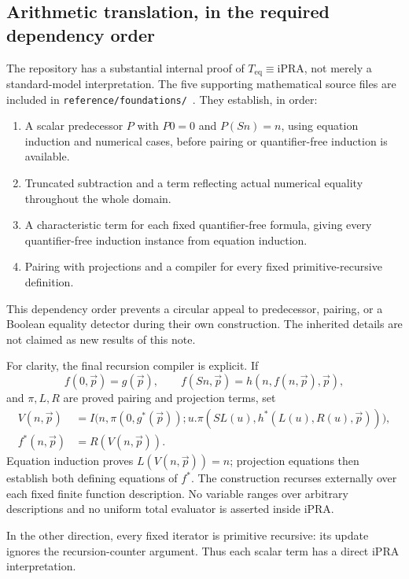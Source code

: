 \documentclass[11pt]{article}
\theoremstyle{definition}\newtheorem{definition}[theorem]{Definition}
\newcommand{\ipra}{\mathrm{iPRA}}
\newcommand{\Teq}{T_{\mathrm{eq}}}
\begin{document}
\subsection{Arithmetic translation, in the required dependency order}

The repository has a substantial internal proof of
$\Teq\equiv\ipra$, not merely a standard-model interpretation.
The five supporting mathematical source files are included in
\texttt{reference/foundations/}~\cite{bridge}. They establish, in order:
\begin{enumerate}
 \item A scalar predecessor $P$ with $P0=0$ and $P(Sn)=n$,
       using equation induction and numerical cases, before pairing
       or quantifier-free induction is available.
 \item Truncated subtraction and a term reflecting actual numerical
       equality throughout the whole domain.
 \item A characteristic term for each fixed quantifier-free formula,
       giving every quantifier-free induction instance from equation
       induction.
 \item Pairing with projections and a compiler for every fixed
       primitive-recursive definition.
\end{enumerate}
This dependency order prevents a circular appeal to predecessor,
pairing, or a Boolean equality detector during their own construction.
The inherited details are not claimed as new results of this note.

For clarity, the final recursion compiler is explicit. If
\[
 f(0,\vec p)=g(\vec p),\qquad
 f(Sn,\vec p)=h(n,f(n,\vec p),\vec p),
\]
and $\pi,L,R$ are proved pairing and projection terms, set
\begin{align*}
 V(n,\vec p)&=
 I\bigl(n,\pi(0,g^*(\vec p));
 u.\pi(SL(u),h^*(L(u),R(u),\vec p))\bigr),\\
 f^*(n,\vec p)&=R(V(n,\vec p)).
\end{align*}
Equation induction proves $L(V(n,\vec p))=n$; projection equations
then establish both defining equations of $f^*$. The construction
recurses externally over each fixed finite function description.
No variable ranges over arbitrary descriptions and no uniform total
evaluator is asserted inside iPRA.

In the other direction, every fixed iterator is primitive recursive:
its update ignores the recursion-counter argument. Thus each scalar
term has a direct iPRA interpretation.
\end{document}
